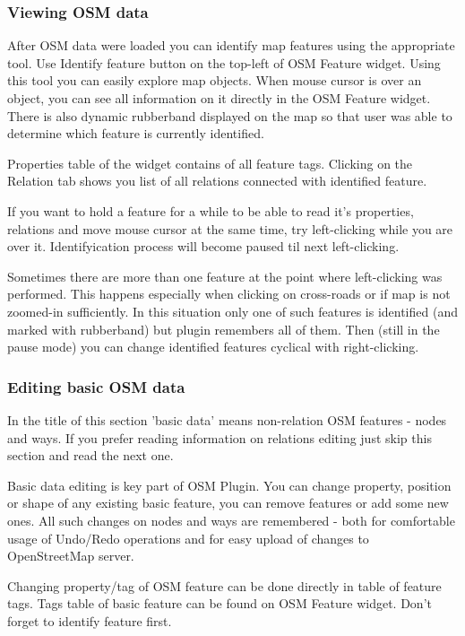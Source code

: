 \subsubsection{Viewing OSM data}

After OSM data were loaded you can identify map features using the
appropriate tool. Use Identify feature button on the top-left of OSM
Feature widget. Using this tool you can easily explore map objects.
When mouse cursor is over an object, you can see all information on it
directly in the OSM Feature widget. There is also dynamic rubberband
displayed on the map so that user was able to determine which feature is
currently identified.

Properties table of the widget contains of all feature tags.
Clicking on the Relation tab shows you list of all relations connected with
identified feature.

If you want to hold a feature for a while to be able to read it's properties,
relations and move mouse cursor at the same time, try left-clicking while you
are over it. Identifyication process will become paused til next
left-clicking.

Sometimes there are more than one feature at the point where left-clicking
was performed. This happens especially when clicking on cross-roads or if map
is not zoomed-in sufficiently. In this situation only one of such features is
identified (and marked with rubberband) but plugin remembers all of them.
Then (still in the pause mode) you can change identified features cyclical
with right-clicking.

\subsubsection{Editing basic OSM data}

In the title of this section 'basic data' means non-relation OSM features -
nodes and ways. If you prefer reading information on relations editing just
skip this section and read the next one.
 
Basic data editing is key part of OSM Plugin. You can change property,
position or shape of any existing basic feature, you can remove features or
add some new ones. All such changes on nodes and ways are remembered - both
for comfortable usage of Undo/Redo operations and for easy upload of  changes
to OpenStreetMap server.


Changing property/tag of OSM feature can be done directly in table of feature
tags. Tags table of basic feature can be found on OSM Feature widget. Don't
forget to identify feature first.
 
